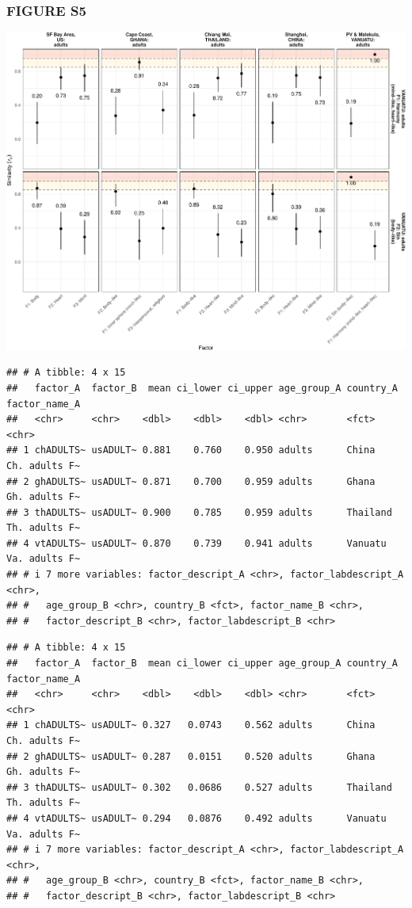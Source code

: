 \documentclass[
  man]{apa6}
\begin{document}
\hypertarget{figure-s5}{%
\subsubsection{FIGURE S5}\label{figure-s5}}

\includegraphics{Script_Re_Weisman_2021_Group1_2024_files/figure-latex/cong cis vt base adults-1.pdf}

\begin{verbatim}
## # A tibble: 4 x 15
##   factor_A  factor_B  mean ci_lower ci_upper age_group_A country_A factor_name_A
##   <chr>     <chr>    <dbl>    <dbl>    <dbl> <chr>       <fct>     <chr>        
## 1 chADULTS~ usADULT~ 0.881    0.760    0.950 adults      China     Ch. adults F~
## 2 ghADULTS~ usADULT~ 0.871    0.700    0.959 adults      Ghana     Gh. adults F~
## 3 thADULTS~ usADULT~ 0.900    0.785    0.959 adults      Thailand  Th. adults F~
## 4 vtADULTS~ usADULT~ 0.870    0.739    0.941 adults      Vanuatu   Va. adults F~
## # i 7 more variables: factor_descript_A <chr>, factor_labdescript_A <chr>,
## #   age_group_B <chr>, country_B <fct>, factor_name_B <chr>,
## #   factor_descript_B <chr>, factor_labdescript_B <chr>
\end{verbatim}

\begin{verbatim}
## # A tibble: 4 x 15
##   factor_A  factor_B  mean ci_lower ci_upper age_group_A country_A factor_name_A
##   <chr>     <chr>    <dbl>    <dbl>    <dbl> <chr>       <fct>     <chr>        
## 1 chADULTS~ usADULT~ 0.327   0.0743    0.562 adults      China     Ch. adults F~
## 2 ghADULTS~ usADULT~ 0.287   0.0151    0.520 adults      Ghana     Gh. adults F~
## 3 thADULTS~ usADULT~ 0.302   0.0686    0.527 adults      Thailand  Th. adults F~
## 4 vtADULTS~ usADULT~ 0.294   0.0876    0.492 adults      Vanuatu   Va. adults F~
## # i 7 more variables: factor_descript_A <chr>, factor_labdescript_A <chr>,
## #   age_group_B <chr>, country_B <fct>, factor_name_B <chr>,
## #   factor_descript_B <chr>, factor_labdescript_B <chr>
\end{verbatim}
\end{document}
